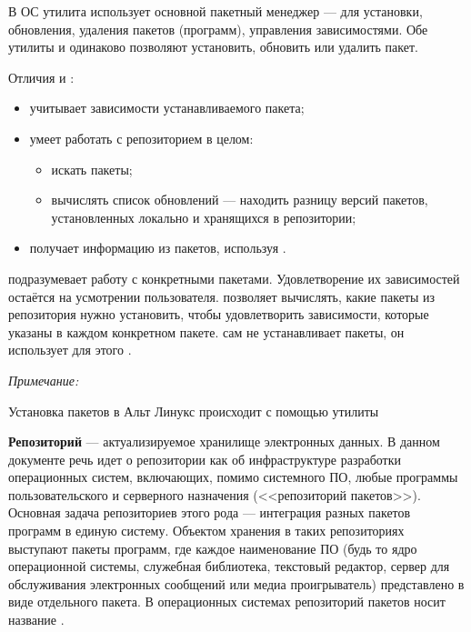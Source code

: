 В ОС  утилита  использует основной пакетный менеджер  ---  для установки, обновления, удаления пакетов (программ), управления зависимостями. Обе утилиты  и  одинаково позволяют установить, обновить или удалить пакет.

Отличия  и :
\begin{itemize}
	\item {} учитывает зависимости устанавливаемого пакета;
	\item {} умеет работать с репозиторием в целом:
	\begin{itemize}
		\item искать пакеты;
		\item вычислять список обновлений --- находить разницу версий пакетов, установленных локально и хранящихся в репозитории;
	\end{itemize}
	\item {} получает информацию из пакетов, используя .
\end{itemize}

 подразумевает работу с конкретными пакетами. Удовлетворение их зависимостей остаётся на усмотрении пользователя.  позволяет вычислять, какие пакеты из репозитория нужно установить, чтобы удовлетворить зависимости, которые указаны в каждом конкретном  пакете.  сам не устанавливает пакеты, он использует для этого .

\noindent 
	\begin{minipage}[b]{0.25\textwidth}
		\vspace{1cm}
		\textit{Примечание:}
	\end{minipage}
	\hspace{0.05\textwidth}
	\begin{minipage}{0.7\textwidth}
		Установка пакетов в Альт Линукс происходит с помощью утилиты 
	\end{minipage}
	\vspace{0.6cm}
	
\textbf{Репозиторий} --- актуализируемое хранилище электронных данных.
В данном документе речь идет о репозитории как об инфраструктуре разработки операционных систем, включающих, помимо системного ПО, любые программы пользовательского и серверного назначения (<<репозиторий пакетов>>). Основная задача репозиториев этого рода --- интеграция разных пакетов программ в единую систему. Объектом хранения в таких репозиториях выступают пакеты программ, где каждое наименование ПО (будь то ядро операционной системы, служебная библиотека, текстовый редактор, сервер для обслуживания электронных сообщений или медиа проигрыватель) представлено в виде отдельного пакета. В операционных системах  репозиторий пакетов носит название .

